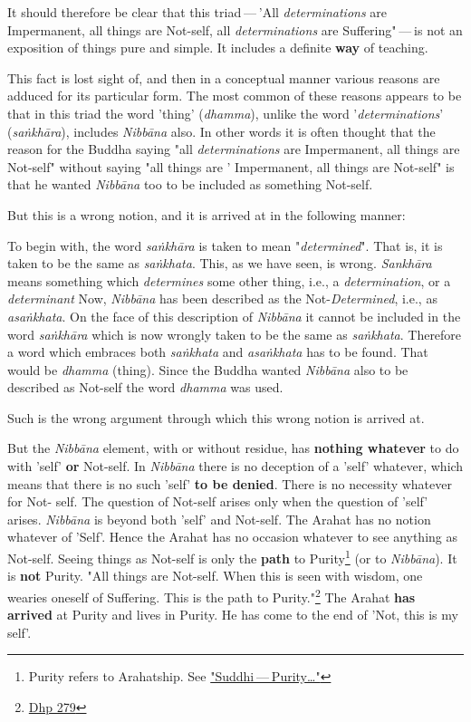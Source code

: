 It should therefore be clear that this triad --- 'All \emph{determinations} are Impermanent, all things are Not-self, all \emph{determinations} are Suffering" --- is not an exposition of things pure and simple. It includes a definite \textbf{way} of teaching.

This fact is lost sight of, and then in a conceptual manner various reasons are adduced for its particular form. The most common of these reasons appears to be that in this triad the word 'thing' (\emph{dhamma}), unlike the word '\emph{determinations}' (\emph{saṅkhāra}), includes \emph{Nibbāna} also. In other words it is often thought that the reason for the Buddha saying "all \emph{determinations} are Impermanent, all things are Not-self" without saying "all things are ' Impermanent, all things are Not-self" is that he wanted \emph{Nibbāna} too to be included as something Not-self.

But this is a wrong notion, and it is arrived at in the following manner:

To begin with, the word \emph{saṅkhāra} is taken to mean "\emph{determined}". That is, it is taken to be the same as \emph{saṅkhata}. This, as we have seen, is wrong. \emph{Sankhāra} means something which \emph{determines} some other thing, i.e., a \emph{determination}, or a \emph{determinant} Now, \emph{Nibbāna} has been described as the Not-\emph{Determined}, i.e., as \emph{asaṅkhata}. On the face of this description of \emph{Nibbāna} it cannot be included in the word \emph{saṅkhāra} which is now wrongly taken to be the same as \emph{saṅkhata}. Therefore a word which embraces both \emph{saṅkhata} and \emph{asaṅkhata} has to be found. That would be \emph{dhamma} (thing). Since the Buddha wanted \emph{Nibbāna} also to be described as Not-self the word \emph{dhamma} was used.

Such is the wrong argument through which this wrong notion is arrived at.

But the \emph{Nibbāna} element, with or without residue, has \textbf{nothing whatever} to do with 'self' \textbf{or} Not-self. In \emph{Nibbāna} there is no deception of a 'self' whatever, which means that there is no such 'self' \textbf{to be denied}. There is no necessity whatever for Not- self. The question of Not-self arises only when the question of 'self' arises. \emph{Nibbāna} is beyond both 'self' and Not-self. The Arahat has no notion whatever of 'Self'. Hence the Arahat has no occasion whatever to see anything as Not-self. Seeing things as Not-self is only the \textbf{path} to Purity\footnote{Purity refers to Arahatship. See \protect\hyperlink{suddhi}{"Suddhi --- Purity\ldots\hspace{0pt}"}} (or to \emph{Nibbāna}). It is \textbf{not} Purity. "All things are Not-self. When this is seen with wisdom, one wearies oneself of Suffering. This is the path to Purity."\footnote{\href{https://suttacentral.net/dhp273-289/en/anandajoti}{Dhp 279}} The Arahat \textbf{has arrived} at Purity and lives in Purity. He has come to the end of 'Not, this is my self'.

